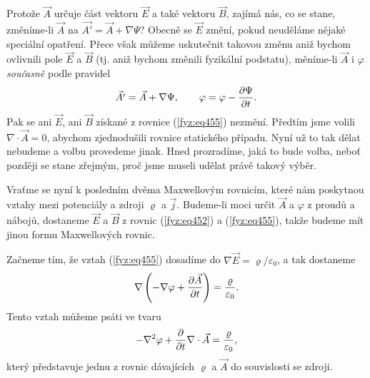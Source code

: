   Protože \(\vec{A}\) určuje část vektoru \(\vec{E}\) a také vektoru \(\vec{B}\), zajímá nás, co se 
  stane, změníme-li \(\vec{A}\) na \(\vec{A'} =\vec{A} +\nabla\Psi\)? Obecně se \(\vec{E}\) změní, 
  pokud neuděláme nějaké speciální opatření. Přece však můžeme uskutečnit 
  takovou změnu aniž bychom ovlivnili pole \(\vec{E}\) a \(\vec{B}\) (tj. aniž bychom změnili 
  fyzikální podstatu), měníme-li \(\vec{A}\) i \(\varphi\) \emph{současně} podle pravidel
  \begin{equation}\label{fyz:eq456}
    \vec{A'} =\vec{A} +\nabla\Psi, \qquad \varphi = \varphi - \dfrac{\partial \Psi}{\partial t}.
  \end{equation} 
  Pak se ani \(\vec{E}\), ani \(\vec{B}\) získané z rovnice (\ref{fyz:eq455}) nezmění. Předtím jsme 
  volili \(\nabla\cdot\vec{A} = 0\), abychom zjednodušili rovnice statického případu. Nyní už to 
  tak dělat nebudeme a volbu provedeme jinak. Hned prozradíme, jaká to bude volba, neboť později se 
  stane zřejmým, proč jsme museli udělat právě takový výběr. 
  
  Vraťme se nyní k posledním dvěma Maxwellovým rovnicím, které nám poskytnou vztahy mezi potenciály 
  a zdroji \(\varrho\) a \(\vec{j}\). Budeme-li moci určit \(\vec{A}\) a \(\varphi\) z proudů a 
  nábojů, dostaneme \(\vec{E}\) a \(\vec{B}\) z rovnic (\ref{fyz:eq452}) a (\ref{fyz:eq455}), takže 
  budeme mít jinou formu Maxwellových rovnic. 
  
  Začneme tím, že vztah (\ref{fyz:eq455}) dosadíme do \(\nabla\vec{E} = \varrho/\varepsilon_0\), a 
  tak dostaneme
  \begin{equation}\label{fyz:eq457}
    \nabla\left(-\nabla\varphi + \dfrac{\partial \vec{A}}{\partial t}\right) = \frac{\varrho}{\varepsilon_0}.
  \end{equation}  
  Tento vztah můžeme psáti ve tvaru
  \begin{equation}\label{fyz:eq458}
    -\nabla^2\varphi + \dfrac{\partial  }{\partial t}\nabla\cdot\vec{A} = \frac{\varrho}{\varepsilon_0},
  \end{equation}
  který představuje jednu z rovnic dávajících \(\varrho\) a \(\vec{A}\) do souvislosti se zdroji. 
  

